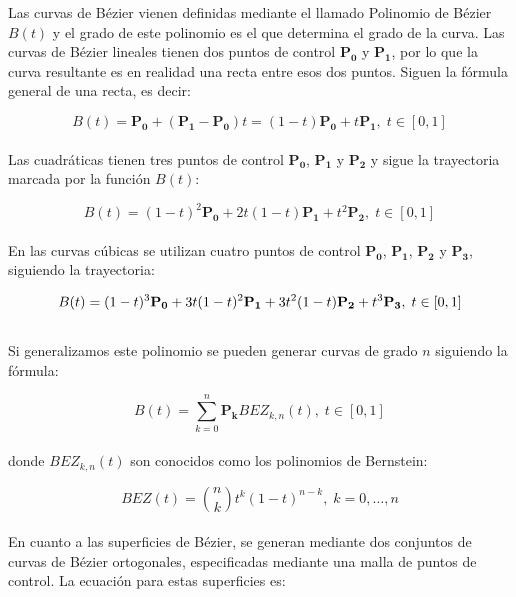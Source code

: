 Las curvas de Bézier vienen definidas mediante el llamado Polinomio de Bézier
$B(t)$ y el grado de este polinomio es el que determina el grado de la curva.
Las curvas de Bézier lineales tienen dos puntos de control $\mathbf{P_0}$ y
$\mathbf{P_1}$, por lo que la curva resultante es en realidad una recta entre
esos dos puntos. Siguen la fórmula general de una recta, es decir:

\begin{equation}
	B(t) = \mathbf{P_0} + (\mathbf{P_1} - \mathbf{P_0})t = (1 - t)\mathbf{P_0} +
	t\mathbf{P_1}, \; t \in [0,1] \label{eq:1}
\end{equation}\\

Las cuadráticas tienen tres puntos de control $\mathbf{P_0}$, $\mathbf{P_1}$ y $\mathbf{P_2}$ y sigue la
trayectoria marcada por la función $B(t)$:

\begin{equation}
	B(t) = (1 - t)^2\mathbf{P_0} + 2t(1-t)\mathbf{P_1} + t^2\mathbf{P_2}, \; t
	\in [0,1] \label{eq:2}
\end{equation}\\

En las curvas cúbicas se utilizan cuatro  puntos de control $\mathbf{P_0}$,
$\mathbf{P_1}$, $\mathbf{P_2}$ y $\mathbf{P_3}$, siguiendo la trayectoria:

\begin{equation}
	B(t) = (1 - t)^3\mathbf{P_0} + 3t(1-t)^2\mathbf{P_1} + 3t^2(1-t)\mathbf{P_2}
	+ t^3\mathbf{P_3}, \; t \in [0,1] \label{eq:3}\\
\end{equation}\\

Si generalizamos este polinomio se pueden generar curvas de grado $n$ siguiendo
la fórmula:

\begin{equation}
	B(t) = \sum_{k = 0}^{n}\mathbf{P_k}BEZ_{k,n}(t) , \; t \in [0,1] \label{eq:4}
\end{equation}\\

donde $BEZ_{k,n}(t)$ son conocidos como los polinomios de Bernstein:

\begin{equation}
	BEZ(t) = \binom{n}{k}t^k(1-t)^{n-k}, \; k=0,\ldots,n \label{eq:5}
\end{equation}\\

En cuanto a las superficies de Bézier, se generan mediante dos conjuntos de
curvas de Bézier ortogonales, especificadas mediante una malla de puntos de
control. La ecuación para estas superficies es:

